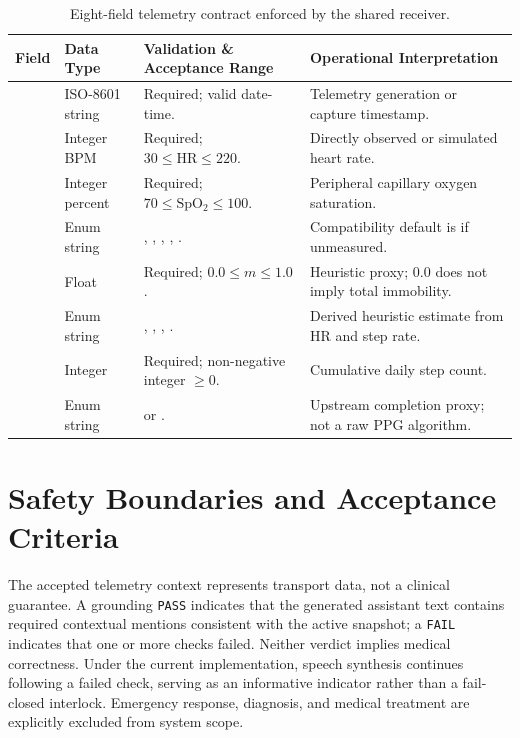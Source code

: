 \begin{table}[H]
\centering
\scriptsize
\renewcommand{\arraystretch}{0.98}
\caption{Eight-field telemetry contract enforced by the shared receiver.}
\label{tab:telemetry-contract}
\begin{tabularx}{\textwidth}{p{28mm}p{22mm}p{44mm}Y}
\toprule
\textbf{Field} & \textbf{Data Type} & \textbf{Validation \& Acceptance Range} & \textbf{Operational Interpretation}\\
\midrule
{} & ISO-8601 string & Required; valid date-time. & Telemetry generation or capture timestamp.\\
 & Integer BPM & Required; $30 \le \mathrm{HR} \le 220$. & Directly observed or simulated heart rate.\\
 & Integer percent & Required; $70 \le \mathrm{SpO_2} \le 100$. & Peripheral capillary oxygen saturation.\\
 & Enum string & , , , , . & Compatibility default is  if unmeasured.\\
 & Float & Required; $0.0 \le m \le 1.0$. & Heuristic proxy; $0.0$ does not imply total immobility.\\
 & Enum string & , , , . & Derived heuristic estimate from HR and step rate.\\
 & Integer & Required; non-negative integer $\ge 0$. & Cumulative daily step count.\\
 & Enum string &  or . & Upstream completion proxy; not a raw PPG algorithm.\\
\bottomrule
\end{tabularx}
\end{table}

\section{Safety Boundaries and Acceptance Criteria}
The accepted telemetry context represents transport data, not a clinical guarantee. A grounding \texttt{PASS} indicates that the generated assistant text contains required contextual mentions consistent with the active snapshot; a \texttt{FAIL} indicates that one or more checks failed. Neither verdict implies medical correctness. Under the current implementation, speech synthesis continues following a failed check, serving as an informative indicator rather than a fail-closed interlock. Emergency response, diagnosis, and medical treatment are explicitly excluded from system scope.

